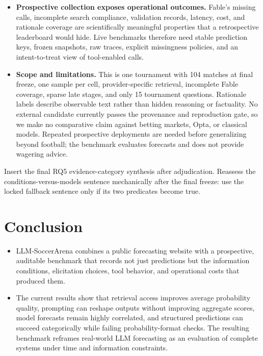 \documentclass[sigconf,review]{acmart}
\newcommand{\arena}{\mbox{LLM-SoccerArena}\xspace}
\newenvironment{draftbullets}
  {\begin{itemize}[leftmargin=1.25em,itemsep=1.5pt,topsep=2pt,parsep=0pt,partopsep=0pt]}
  {\end{itemize}}
\newcommand{\TODO}[1]{{\color{red}#1}}
\begin{document}
\begin{draftbullets}
  \item \textbf{Prospective collection exposes operational outcomes.} Fable's missing calls, incomplete
  search compliance, validation records, latency, cost, and rationale coverage are scientifically
  meaningful properties that a retrospective leaderboard would hide. Live benchmarks therefore need
  stable prediction keys, frozen snapshots, raw traces, explicit missingness policies, and an
  intent-to-treat view of tool-enabled calls.

  \item \textbf{Scope and limitations.} This is one tournament with 104 matches at final freeze, one
  sample per cell, provider-specific retrieval, incomplete Fable coverage, sparse late stages, and
  only 15 tournament questions. Rationale labels describe observable text rather than hidden
  reasoning or factuality. No external candidate currently passes the provenance and reproduction
  gate, so we make no comparative claim against betting markets, Opta, or classical models. Repeated
  prospective deployments are needed before generalizing beyond football; the benchmark evaluates
  forecasts and does not provide wagering advice.
\end{draftbullets}

\TODO{Insert the final RQ5 evidence-category synthesis after adjudication. Reassess the conditions-versus-models sentence mechanically after the final freeze: use the locked fallback sentence only if its two predicates become true.}

\section{Conclusion}

\begin{draftbullets}
  \item \arena combines a public forecasting website with a prospective, auditable benchmark that
  records not just predictions but the information conditions, elicitation choices, tool behavior,
  and operational costs that produced them.
  \item The current results show that retrieval access improves average probability quality,
  prompting can reshape outputs without improving aggregate scores, model forecasts remain highly
  correlated, and structured predictions can succeed categorically while failing probability-format
  checks. The resulting benchmark reframes real-world LLM forecasting as an evaluation of complete
  systems under time and information constraints.
\end{draftbullets}
\end{document}
